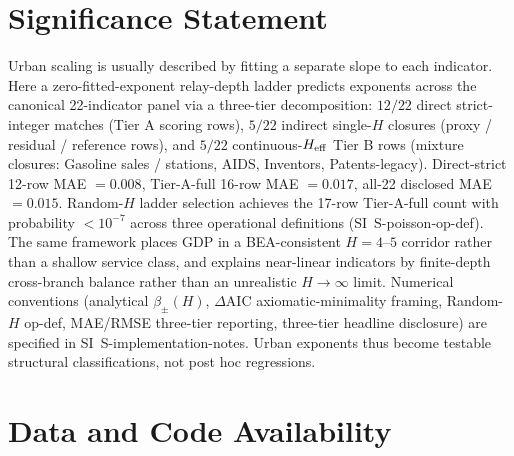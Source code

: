 \section*{Significance Statement}

Urban scaling is usually described by fitting a separate slope to each indicator. Here a zero-fitted-exponent relay-depth ladder predicts exponents across the canonical 22-indicator panel via a three-tier decomposition: $12/22$ direct strict-integer matches (Tier A scoring rows), $5/22$ indirect single-$H$ closures (proxy / residual / reference rows), and $5/22$ continuous-$H_{\rm eff}$ Tier B rows (mixture closures: Gasoline sales / stations, AIDS, Inventors, Patents-legacy). Direct-strict 12-row MAE $= 0.008$, Tier-A-full 16-row MAE $= 0.017$, all-22 disclosed MAE $= 0.015$. Random-$H$ ladder selection achieves the 17-row Tier-A-full count with probability $<10^{-7}$ across three operational definitions (SI~\textsf{S-poisson-op-def}). The same framework places GDP in a BEA-consistent $H=4$--$5$ corridor rather than a shallow service class, and explains near-linear indicators by finite-depth cross-branch balance rather than an unrealistic $H\to\infty$ limit. Numerical conventions (analytical $\beta_\pm(H)$, $\Delta\mathrm{AIC}$ axiomatic-minimality framing, Random-$H$ op-def, MAE/RMSE three-tier reporting, three-tier headline disclosure) are specified in SI~\textsf{S-implementation-notes}. Urban exponents thus become testable structural classifications, not post hoc regressions.

\section*{Data and Code Availability}

